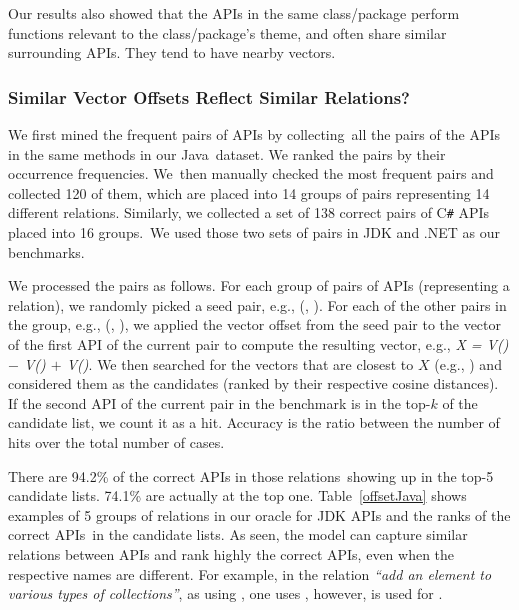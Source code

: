 Our results also showed that the APIs in the same class/package
perform functions relevant to the class/package's theme, and often
share similar surrounding APIs. They tend to have nearby vectors.

\subsubsection*{Similar Vector Offsets Reflect Similar Relations?}
\label{vector-offset-section}
We first mined the frequent pairs of APIs by collecting~all the
pairs of the APIs in the same methods in our Java~dataset. We ranked
the pairs by their occurrence frequencies.
We~then manually checked the most frequent pairs
and collected 120 of them, which are placed into 14 groups of
pairs representing 14 different relations. Similarly, we collected a
set of 138 correct pairs of C\texttt{\#} APIs placed into 16
groups.~We used those two sets of pairs in JDK and .NET as our
benchmarks.



We processed the pairs as follows. For each group of pairs of APIs
(representing a relation), we randomly picked a seed pair, e.g.,
(, ). For each of the other pairs in
the group, e.g., (, ), we applied the
vector offset from the seed pair to the vector of the first API of the
current pair to compute the resulting vector, e.g., \textit{X =
  V() $-$ V() $+$
  V()}. We then searched for the vectors that are
closest to $X$ (e.g., ) and considered them as the
candidates (ranked by their respective cosine distances). If the
second API of the current pair in the benchmark is in the top-$k$ of
the candidate list, we count it as a hit. Accuracy is the ratio
between the number of hits over the total number of cases.


There are 94.2\% of the correct APIs in those relations~show\-ing up in the
top-5 candidate lists. 74.1\% are actually at the top
one. Table~\ref{offsetJava} shows examples of 5 groups of relations in
our oracle for JDK APIs and the ranks of the correct APIs~in the
candidate lists. As seen, 
the model can capture similar relations between APIs and rank highly
the correct APIs, even when the respective names are different. For
example, in the relation {\em ``add an element to various types of
  collections''}, as using , one uses ,
however,  is used for .


